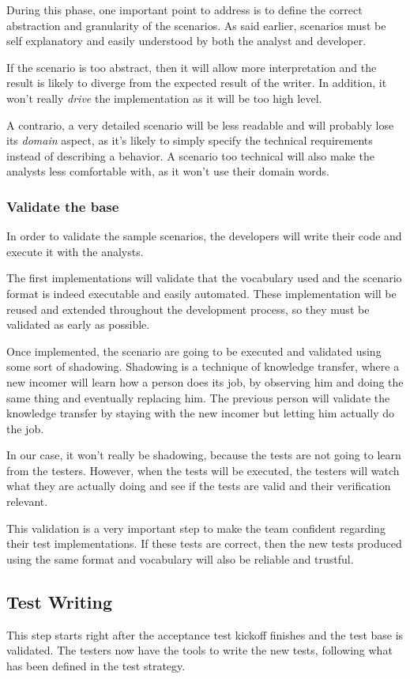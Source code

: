 During this phase, one important point to address is to define the correct
abstraction and granularity of the scenarios.
As said earlier, scenarios must be self explanatory and easily understood by
both the analyst and developer.

If the scenario is too abstract, then it will allow more interpretation and
the result is likely to diverge from the expected result of the writer.
In addition, it won't really \textit{drive} the implementation as it will be
too high level.

A contrario, a very detailed scenario will be less readable and will probably
lose its \textit{domain} aspect, as it's likely to simply specify the
technical requirements instead of describing a behavior.
A scenario too technical will also make the analysts less comfortable with, as
it won't use their domain words.

\subsubsection{Validate the base}
In order to validate the sample scenarios, the developers will write their
code and execute it with the analysts.

The first implementations will validate that the vocabulary used and the
scenario format is indeed executable and easily automated.
These implementation will be reused and extended throughout the development
process, so they must be validated as early as possible.

Once implemented, the scenario are going to be executed and validated using
some sort of shadowing.
Shadowing is a technique of knowledge transfer, where a new incomer will learn
how a person does its job, by observing him and doing the same thing and
eventually replacing him.
The previous person will validate the knowledge transfer by staying with the
new incomer but letting him actually do the job.

In our case, it won't really be shadowing, because the tests are not going to
learn from the testers.
However, when the tests will be executed, the testers will watch what they
are actually doing and see if the tests are valid and their verification
relevant.

This validation is a very important step to make the team confident regarding
their test implementations.
If these tests are correct, then the new tests produced using the same format
and vocabulary will also be reliable and trustful.

\subsection{Test Writing}\label{subsec:test-writing}
This step starts right after the acceptance test kickoff finishes and the
test base is validated.
The testers now have the tools to write the new tests, following what
has been defined in the test strategy.

